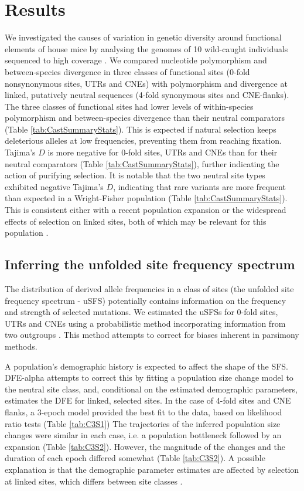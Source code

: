 \section{Results}

	We investigated the causes of variation in genetic diversity around functional elements of house mice by analysing the genomes of 10 wild-caught individuals sequenced to high coverage \citep{RN122}. We compared nucleotide polymorphism and between-species divergence in three classes of functional sites (0-fold nonsynonymous sites, UTRs and CNEs) with polymorphism and divergence at linked, putatively neutral sequences (4-fold synonymous sites and CNE-flanks). The three classes of functional sites had lower levels of within-species polymorphism and between-species divergence than their neutral comparators (Table \ref{tab:CastSummaryStats}). This is expected if natural selection keeps deleterious alleles at low frequencies, preventing them from reaching fixation. Tajima's $D$ is more negative for 0-fold sites, UTRs and CNEs than for their neutral comparators (Table \ref{tab:CastSummaryStats}), further indicating the action of purifying selection. It is notable that the two neutral site types exhibited negative Tajima's $D$, indicating that rare variants are more frequent than expected in a Wright-Fisher population (Table \ref{tab:CastSummaryStats}). This is consistent either with a recent population expansion or the widespread effects of selection on linked sites, both of which may be relevant for this population \citep{RN122,RN340}. 
	
\linespread{1}

\linespread{2}

\subsection{Inferring the unfolded site frequency spectrum}

	The distribution of derived allele frequencies in a class of sites (the unfolded site frequency spectrum - uSFS) potentially contains information on the frequency and strength of selected mutations. We estimated the uSFSs for 0-fold sites, UTRs and CNEs using a probabilistic method incorporating information from two outgroups \citep{RN321}. This method attempts to correct for biases inherent in parsimony methods. 

	A population's demographic history is expected to affect the shape of the SFS. DFE-alpha attempts to correct this by fitting a population size change model to the neutral site class, and, conditional on the estimated demographic parameters, estimates the DFE for linked, selected sites. In the case of 4-fold sites and CNE flanks, a 3-epoch model provided the best fit to the data, based on likelihood ratio tests (Table \ref{tab:C3S1}) The trajectories of the inferred population size changes were similar in each case, i.e. a population bottleneck followed by an expansion (Table \ref{tab:C3S2}). However, the magnitude of the changes and the duration of each epoch differed somewhat (Table \ref{tab:C3S2}). A possible explanation is that the demographic parameter estimates are affected by selection at linked sites, which differs between site classes \citep{RN149, RN241, RN242}. 

